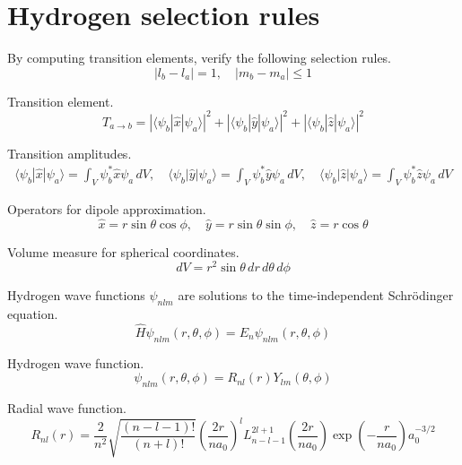 

\section*{Hydrogen selection rules}

By computing transition elements, verify the following selection rules.
\begin{equation*}
|l_b-l_a|=1,\quad|m_b-m_a|\le1
\end{equation*}

Transition element.
\begin{equation*}
T_{a\rightarrow b}
=|\langle\psi_b|\hat x|\psi_a\rangle|^2
+|\langle\psi_b|\hat y|\psi_a\rangle|^2
+|\langle\psi_b|\hat z|\psi_a\rangle|^2
\end{equation*}

Transition amplitudes.
\begin{gather*}
\langle\psi_b|\hat x|\psi_a\rangle
=\int_V\psi_b^*\hat x\psi_a\,dV,
\quad
\langle\psi_b|\hat y|\psi_a\rangle
=\int_V\psi_b^*\hat y\psi_a\,dV,
\quad
\langle\psi_b|\hat z|\psi_a\rangle
=\int_V\psi_b^*\hat z\psi_a\,dV
\end{gather*}

Operators for dipole approximation.
\begin{equation*}
\hat x=r\sin\theta\cos\phi,
\quad
\hat y=r\sin\theta\sin\phi,
\quad
\hat z=r\cos\theta
\end{equation*}

Volume measure for spherical coordinates.
\begin{equation*}
dV=r^2\sin\theta\,dr\,d\theta\,d\phi
\end{equation*}

Hydrogen wave functions $\psi_{nlm}$ are solutions to
the time-independent Schr\"odinger equation.
\begin{equation*}
\hat H\psi_{nlm}(r,\theta,\phi)=E_n\psi_{nlm}(r,\theta,\phi)
\end{equation*}

Hydrogen wave function.
\begin{equation*}
\psi_{nlm}(r,\theta,\phi)=R_{nl}(r)Y_{lm}(\theta,\phi)
\end{equation*}

Radial wave function.
\begin{equation*}
R_{nl}(r)=
\frac{2}{n^2}
\sqrt{\frac{(n-l-1)!}{(n+l)!}}
\left(\frac{2r}{na_0}\right)^l
L_{n-l-1}^{2l+1}\left(\frac{2r}{na_0}\right)
\exp\left(-\frac{r}{na_0}\right)
a_0^{-3/2}
\end{equation*}

